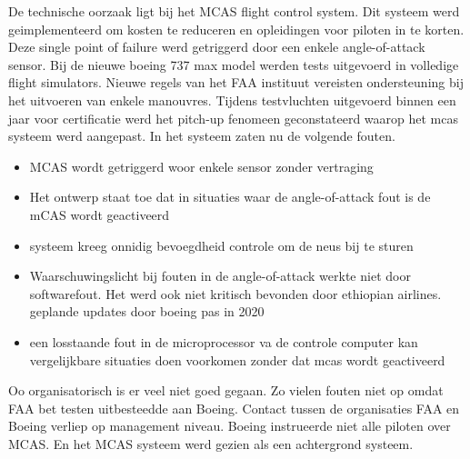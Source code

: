 \documentclass{article}
\begin{document}
	De technische oorzaak ligt bij het MCAS flight control system. Dit systeem werd geimplementeerd om kosten te reduceren en opleidingen voor piloten  in te korten.  Deze single point of failure \cite{uran05042019SPOF}
	werd getriggerd door een enkele angle-of-attack sensor\cite{boeing737maxdisplay}.
	Bij de  nieuwe boeing 737 max model werden tests uitgevoerd in volledige flight simulators. Nieuwe   regels van het FAA instituut vereisten ondersteuning bij het uitvoeren van enkele manouvres. Tijdens testvluchten uitgevoerd binnen een jaar voor certificatie werd het pitch-up fenomeen geconstateerd waarop het mcas systeem werd aangepast. 
	In het  systeem zaten nu de volgende fouten.
	
	\begin{itemize}
		\item MCAS wordt getriggerd woor enkele sensor zonder vertraging
		\item Het ontwerp staat toe dat  in situaties waar de angle-of-attack fout is de mCAS wordt geactiveerd
		\item systeem kreeg onnidig bevoegdheid controle om de neus bij te sturen
		\item  Waarschuwingslicht bij fouten in de angle-of-attack werkte niet door  softwarefout. Het werd ook niet kritisch bevonden door ethiopian airlines. geplande updates door boeing pas in 2020
		\item een losstaande fout in de microprocessor va de controle computer kan vergelijkbare situaties doen voorkomen zonder dat mcas wordt geactiveerd
	\end{itemize}
	Oo organisatorisch is er veel niet goed gegaan. Zo vielen fouten niet op omdat FAA bet testen uitbesteedde aan Boeing. Contact tussen de organisaties FAA en Boeing verliep op management niveau. Boeing instrueerde niet alle piloten over MCAS. En het MCAS systeem werd gezien als een achtergrond  systeem.
	
\end{document}
